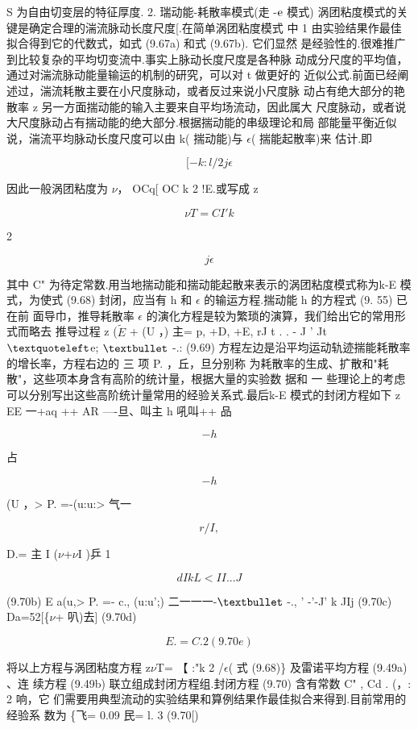 S 为自由切变层的特征厚度. 2. 瑞动能-耗散率模式(走 -${\rm e}$ 模式) 涡团粘度模式的关键是确定合理的湍流脉动长度尺度[.在简单涡团粘度模式 中 1 由实验结果作最佳拟合得到它的代数式，如式 (9.67a) 和式 (9.67b). 它们显然 是经验性的.很难推广到比较复杂的平均切变流中.事实上脉动长度尺度是各种脉 动成分尺度的平均值，通过对湍流脉动能量输运的机制的研究，可以对 t 做更好的 近似公式.前面已经阐述过，湍流耗散主要在小尺度脉动，或者反过来说小尺度脉 动占有绝大部分的艳散率 z 另一方面揣动能的输入主要来自平均场流动，因此属大 尺度脉动，或者说大尺度脉动占有揣动能的绝大部分.根据揣动能的串级理论和局 部能量平衡近似说，湍流平均脉动长度尺度可以由 k( 揣动能)与 $\epsilon$( 揣能起散率)来 估计.即

\[[ - k:l/2 j\epsilon \]

因此一般涡团粘度为 $\nu$， OCq[ OC k 2 !E.或写成 z

\[\nu  T = CI' k\]

2

\begin{equation*}j \epsilon \tag{9.68}\end{equation*}

其中 C" 为待定常数.用当地揣动能和揣动能起散来表示的涡团粘度模式称为k-E 模 式，为使式 (9.68) 封闭，应当有 h 和 $\epsilon$ 的输运方程.揣动能 h 的方程式 (9. 55) 已在前 面导巾，推导耗散率 $\epsilon$ 的演化方程是较为繁琐的演算，我们给出它的常用形式而略去 推导过程 z ($\tilde{E}$ + (U ，) 主= p, +D, +E, rJ t . . - J ' Jt ${\rm ‘}$e; ${\rm •}$ -.: (9.69) 方程左边是沿平均运动轨迹揣能耗散率的增长率，方程右边的 三 项 P. ，丘，旦分别称 为耗散率的生成、扩散和"耗散"，这些项本身含有高阶的统计量，根据大量的实验数 据和 一 些理论上的考虑可以分别写出这些高阶统计量常用的经验关系式.最后k-E 模式的封闭方程如下 z EE 一+aq ++ AR ----旦、叫主 h 吼叫++ 品

\[-h\]

占

\[-h\]

 (U ，> P. =-(u:u:> 气一

\begin{equation*}r/I,\tag{9.70a}\end{equation*}

D.= 主 I ($\nu$+$\nu$I )乒 1

\[dIkL <I I. ..J\]

(9.70b) E a(u,> P. =- c., (u:u';) 二一一一-${\rm •}$ -., ' -'-J' k JIj (9.70c) Da=52[\{$\nu$+ 叭)去] (9.70d)

\[E. = C.2 (9.70e)\]

将以上方程与涡团粘度方程 z$\nu$T= 【 :"k 2 /$\epsilon$( 式 (9.68)\} 及雷诺平均方程 (9.49a) 、连 续方程 (9.49b) 联立组成封闭方程组.封闭方程 (9.70) 含有常数 C" , Cd . (，: 2 响，它 们需要用典型流动的实验结果和算例结果作最佳拟合来得到.目前常用的经验系 数为 \{飞= 0.09 民= l. 3 (9.70[)

